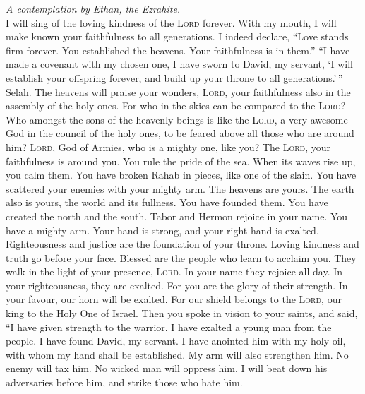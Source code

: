 \emph{A contemplation by Ethan, the Ezrahite.}\\
 I will sing of the loving kindness of the \textsc{Lord}
forever. With my mouth, I will make known your faithfulness to all
generations.  I indeed declare, ``Love stands firm
forever. You established the heavens. Your faithfulness is in them.''
 ``I have made a covenant with my chosen one, I have sworn
to David, my servant,  `I will establish your offspring
forever, and build up your throne to all generations.'\,'' Selah.
 The heavens will praise your wonders, \textsc{Lord}, your
faithfulness also in the assembly of the holy ones.  For
who in the skies can be compared to the \textsc{Lord}? Who amongst the
sons of the heavenly beings is like the \textsc{Lord},  a
very awesome God in the council of the holy ones, to be feared above all
those who are around him?  \textsc{Lord}, God of Armies,
who is a mighty one, like you? The \textsc{Lord}, your faithfulness is
around you.  You rule the pride of the sea. When its waves
rise up, you calm them.  You have broken Rahab in pieces,
like one of the slain. You have scattered your enemies with your mighty
arm.  The heavens are yours. The earth also is yours, the
world and its fullness. You have founded them.  You have
created the north and the south. Tabor and Hermon rejoice in your name.
 You have a mighty arm. Your hand is strong, and your
right hand is exalted.  Righteousness and justice are the
foundation of your throne. Loving kindness and truth go before your
face.  Blessed are the people who learn to acclaim you.
They walk in the light of your presence, \textsc{Lord}. 
In your name they rejoice all day. In your righteousness, they are
exalted.  For you are the glory of their strength. In
your favour, our horn will be exalted.  For our shield
belongs to the \textsc{Lord}, our king to the Holy One of Israel.
 Then you spoke in vision to your saints, and said, ``I
have given strength to the warrior. I have exalted a young man from the
people.  I have found David, my servant. I have anointed
him with my holy oil,  with whom my hand shall be
established. My arm will also strengthen him.  No enemy
will tax him. No wicked man will oppress him.  I will
beat down his adversaries before him, and strike those who hate him.
